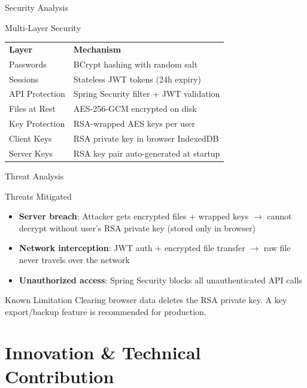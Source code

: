 \documentclass{SKP-beamer}
\begin{document}
\begin{frame}{Security Analysis}
\begin{block}{Multi-Layer Security}
\small
\begin{tabular}{@{}ll@{}}
\textbf{Layer} & \textbf{Mechanism} \\[0.2em]
Passwords & BCrypt hashing with random salt \\[0.2em]
Sessions & Stateless JWT tokens (24h expiry) \\[0.2em]
API Protection & Spring Security filter + JWT validation \\[0.2em]
Files at Rest & AES-256-GCM encrypted on disk \\[0.2em]
Key Protection & RSA-wrapped AES keys per user \\[0.2em]
Client Keys & RSA private key in browser IndexedDB \\[0.2em]
Server Keys & RSA key pair auto-generated at startup \\
\end{tabular}
\end{block}
\end{frame}

\begin{frame}{Threat Analysis}
\begin{block}{Threats Mitigated}
\begin{itemize}
  \item \textbf{Server breach}: Attacker gets encrypted files + wrapped keys $\rightarrow$ cannot decrypt without user's RSA private key (stored only in browser)
  \item \textbf{Network interception}: JWT auth + encrypted file transfer $\rightarrow$ raw file never travels over the network
  \item \textbf{Unauthorized access}: Spring Security blocks all unauthenticated API calls
\end{itemize}
\end{block}

\begin{alertblock}{Known Limitation}
Clearing browser data deletes the RSA private key. A key export/backup feature is recommended for production.
\end{alertblock}
\end{frame}

\section{Innovation \& Technical Contribution}
\end{document}
